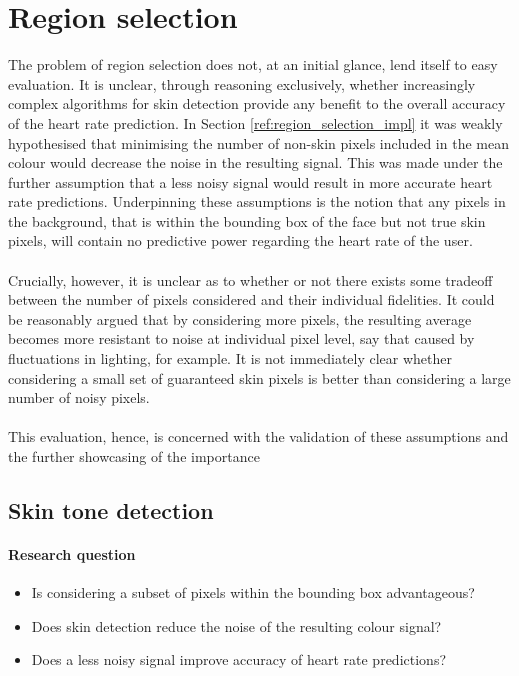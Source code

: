 
\section{Region selection}
\label{section:region_selection}
The problem of region selection does not, at an initial glance, lend itself to easy evaluation.
It is unclear, through reasoning exclusively, whether increasingly complex algorithms for skin detection provide any benefit to the overall accuracy of the heart rate prediction.
In Section \ref{ref:region_selection_impl} it was weakly hypothesised that minimising the number of non-skin pixels included in the mean colour would decrease the noise in the resulting signal. 
This was made under the further assumption that a less noisy signal would result in more accurate heart rate predictions. 
Underpinning these assumptions is the notion that any pixels in the background, that is within the bounding box of the face but not true skin pixels, will contain no predictive power regarding the heart rate of the user.
\\\\
Crucially, however, it is unclear as to whether or not there exists some tradeoff between the number of pixels considered and their individual fidelities. 
It could be reasonably argued that by considering more pixels, the resulting average becomes more resistant to noise at individual pixel level, say that caused by fluctuations in lighting, for example.
It is not immediately clear whether considering a small set of guaranteed skin pixels is better than considering a large number of noisy pixels.
\\\\
This evaluation, hence, is concerned with the validation of these assumptions and the further showcasing of the importance 
\subsection{Skin tone detection}
\label{section:skin_tone_detection}
\paragraph{Research question}
\begin{itemize}
   \item Is considering a subset of pixels within the bounding box advantageous? 
   \item Does skin detection reduce the noise of the resulting colour signal?
   \item Does a less noisy signal improve accuracy of heart rate predictions?
\end{itemize}

